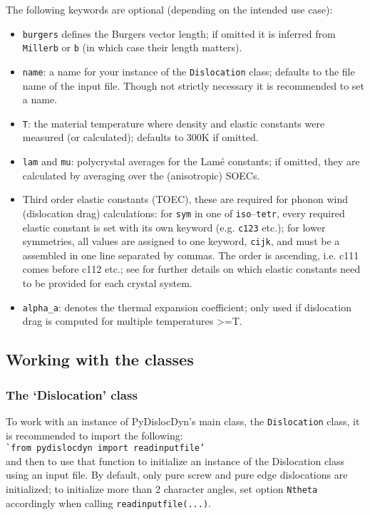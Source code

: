 \documentclass[11pt,letterpaper,oneside,pdftex]{article}
\begin{document}
\noindent
The following keywords are optional (depending on the intended use case):
\begin{itemize}
\item \verb|burgers| defines the Burgers vector length; if omitted it is inferred from \verb|Millerb| or \verb|b| (in which case their length matters).

\item \verb|name|: a name for your instance of the \verb|Dislocation| class; defaults to the file name of the input file.
Though not strictly necessary it is recommended to set a name.

\item \verb|T|: the material temperature where density and elastic constants were measured (or calculated); defaults to 300K if omitted.

\item \verb|lam| and \verb|mu|: polycrystal averages for the Lam\'e constants; if omitted, they are calculated by averaging over the (anisotropic) SOECs.

\item Third order elastic constants (TOEC), these are required for phonon wind (dislocation drag) calculations:
for \verb|sym| in one of \verb|iso|--\verb|tetr|, every required elastic constant is set with its own keyword (e.g. \verb|c123| etc.);
for lower symmetries, all values are assigned to one keyword, \verb|cijk|, and must be a assembled in one line separated by commas.
The order is ascending, i.e. c111 comes before c112 etc.; see \cite{Brugger:1965} for further details on which elastic constants need to be provided for each crystal system.

\item \verb|alpha_a|: denotes the thermal expansion coefficient; only used if dislocation drag is computed for multiple temperatures >=T.
\end{itemize}



\subsection{Working with the classes}
\label{sec:classes}
\subsubsection{The `Dislocation' class}
\label{sec:Dislocation}

To work with an instance of PyDislocDyn's main class, the \verb|Dislocation| class, it is recommended to import the following:
\\\verb|`from pydislocdyn import readinputfile’|\\
and then to use that function to initialize an instance of the Dislocation class using an input file.
By default, only pure screw and pure edge dislocations are initialized; to initialize more than 2 character angles, set option \verb|Ntheta| accordingly when calling \verb|readinputfile(...)|.
\end{document}
